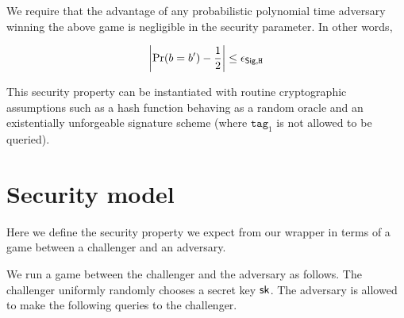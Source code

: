 \documentclass[12pt]{article}
\begin{document}
We require that the advantage of any probabilistic polynomial time adversary winning the above game is negligible in the security parameter. In other words,

$$\left \vert \Pr(b = b') -\frac{1}{2} \right \vert \le \epsilon_{\mathsf{Sig}, \texttt{H}}$$

This security property can be instantiated with routine cryptographic assumptions such as a hash function behaving as a random oracle and an existentially unforgeable signature scheme (where $\texttt{tag}_1$ is not allowed to be queried).

\section{Security model} \label{sec:model}
Here we define the security property we expect from our wrapper in terms of a game between a challenger and an adversary.

We run a game between the challenger and the adversary as follows. The challenger uniformly randomly chooses a secret key $\mathsf{sk}$. The adversary is allowed to make the following queries to the challenger.
\end{document}
